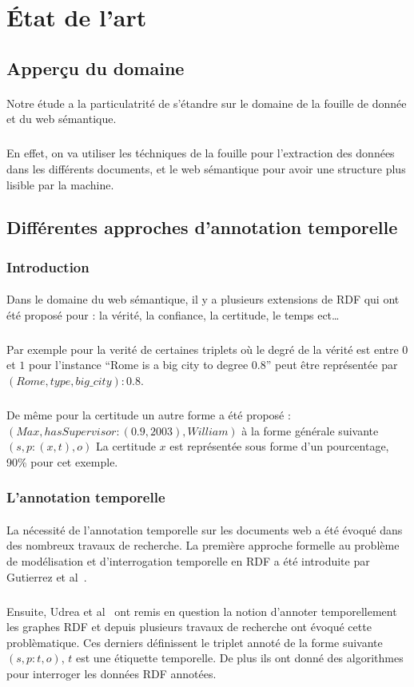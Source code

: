 \section*{État de l'art}
\subsection*{Apperçu du domaine}
\paragraph{}
Notre étude a la particulatrité de s'étandre sur le domaine de la fouille de donnée et du web sémantique.
\subparagraph{}
En effet, on va utiliser les téchniques de la fouille pour l'extraction des données dans les différents documents, et le web sémantique pour avoir une structure plus lisible par la machine.
\subsection*{Différentes approches d'annotation temporelle}			
\subsubsection{Introduction}
\paragraph{}
Dans le domaine du web sémantique, il y a plusieurs extensions de RDF qui ont été proposé pour : la vérité, la confiance, la certitude, le temps ect…
\subparagraph{}
Par exemple pour la verité de certaines triplets où le degré de la vérité est entre $0$ et $1$
pour l’instance “Rome is a big city to degree 0.8” peut être représentée par $(Rome, type,big{\_}city) : 0.8$.
\subparagraph{}
De même pour la certitude un autre forme a été proposé :
$(Max,hasSupervisor : (0.9,2003),William)$ à la forme générale suivante $(s, p : (x,t),o)$
\newline 
La certitude $x$ est représentée sous forme d'un pourcentage, 90\% pour cet exemple.
\subsubsection{L'annotation temporelle}
\paragraph{}
La nécessité de l’annotation temporelle sur les documents web a été évoqué dans des nombreux travaux de recherche. La première approche formelle au problème de modélisation et d’interrogation temporelle en RDF a été introduite par Gutierrez et al~\cite{gutierrez2005}.
\subparagraph{}
Ensuite, Udrea et al~\cite{udrea2006} ont remis en question la notion d'annoter temporellement les graphes RDF et depuis plusieurs travaux de recherche ont évoqué cette problèmatique. 
Ces derniers définissent le triplet annoté de la forme suivante $(s,p:t,o)$, $t$ est une étiquette temporelle.
De plus ils ont donné des algorithmes pour interroger les données RDF annotées.

